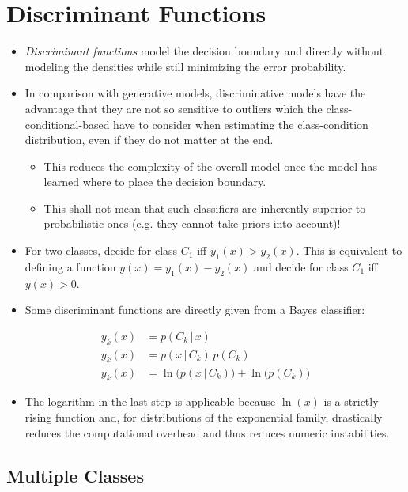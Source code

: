 \documentclass[a4paper, 11pt, accentcolor = tud3b]{tudreport}
\newcommand{\given}{\ensuremath{\,\vert\,}}
\begin{document}
		\section{Discriminant Functions}
			\begin{itemize}
				\item \emph{Discriminant functions} model the decision boundary and directly without modeling the densities while still minimizing the error probability.
				\item In comparison with generative models, discriminative models have the advantage that they are not so sensitive to outliers which the class-conditional-based have to consider when estimating the class-condition distribution, even if they do not matter at the end.
					\begin{itemize}
						\item This reduces the complexity of the overall model once the model has learned where to place the decision boundary.
						\item This shall not mean that such classifiers are inherently superior to probabilistic ones (e.g. they cannot take priors into account)!
					\end{itemize}
				\item For two classes, decide for class \(C_1\) iff \( y_1(x) > y_2(x) \). This is equivalent to defining a function \( y(x) = y_1(x) - y_2(x) \) and decide for class \(C_1\) iff \( y(x) > 0 \).
				\item Some discriminant functions are directly given from a Bayes classifier:
			\end{itemize}
			\begin{align}
				y_k(x) &= p(C_k \given x) \\
				y_k(x) &= p(x \given C_k) \, p(C_k) \\
				y_k(x) &= \ln\big(p(x \given C_k)\big) + \ln\big(p(C_k)\big)
			\end{align}
			\begin{itemize}
				\item[] The logarithm in the last step is applicable because \(\ln(x)\) is a strictly rising function and, for distributions of the exponential family, drastically reduces the computational overhead and thus reduces numeric instabilities.
			\end{itemize}

			\subsection{Multiple Classes}
				\label{sec:classificationMultiple}
\end{document}
